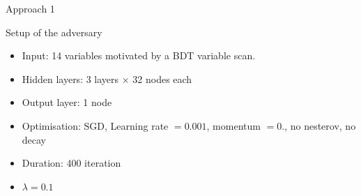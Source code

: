 \begin{frame}{Approach 1}
\begin{block}{Setup of the adversary}
    \begin{itemize}
    \item Input: \num{14} variables motivated by a BDT variable scan.
    \item Hidden layers: \num{3} \ELU layers $\times$ \num{32} nodes each
    \item Output layer: \num{1} \SIGMOID node
    \item Optimisation: SGD, Learning rate $=0.001$, momentum $=0.$, no nesterov, no decay
    \item Duration: 400 iteration
    \item $\lambda = 0.1$
    \end{itemize}
    \end{block}
\end{frame}

